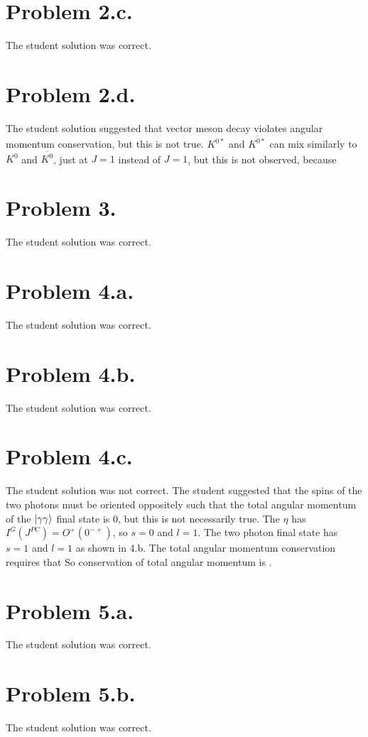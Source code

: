 \documentclass{article}
\begin{document}
\section*{Problem 2.c.}
The student solution was correct.
\section*{Problem 2.d.}
The student solution suggested that vector meson decay violates angular momentum conservation, but this is not true. $K^{0*}$ and $\overline{K^{0*}}$ can mix similarly to $K^{0}$ and $\overline{K^{0}}$, just at $J=1$ instead of $J=1$, but this is not observed, because 
\section*{Problem 3.}
The student solution was correct.
\section*{Problem 4.a.}
The student solution was correct.
\section*{Problem 4.b.}
The student solution was correct.
\section*{Problem 4.c.}
The student solution was not correct. The student suggested that the spins of the two photons must be oriented oppositely such that the total angular momentum of the $|\gamma \gamma\rangle$ final state is 0, but this is not necessarily true. The $\eta$ has $I^G(J^{PC})=O^+(0^{-+})$, so $s=0$ and $l=1$. The two photon final state has $s=1$ and $l=1$ as shown in 4.b. The total angular momentum conservation requires that
So conservation of total angular momentum is .
\section*{Problem 5.a.}
The student solution was correct.
\section*{Problem 5.b.}
The student solution was correct.
\end{document}
